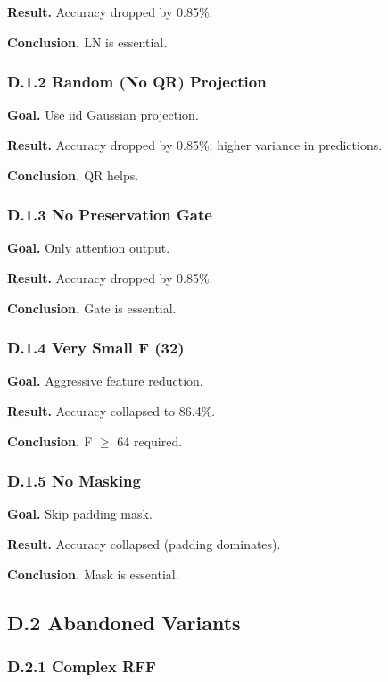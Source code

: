 \textbf{Result.} Accuracy dropped by 0.85\%.

\textbf{Conclusion.} LN is essential.

\subsubsection{D.1.2 Random (No QR) Projection}

\textbf{Goal.} Use iid Gaussian projection.

\textbf{Result.} Accuracy dropped by 0.85\%; higher variance in 
predictions.

\textbf{Conclusion.} QR helps.

\subsubsection{D.1.3 No Preservation Gate}

\textbf{Goal.} Only attention output.

\textbf{Result.} Accuracy dropped by 0.85\%.

\textbf{Conclusion.} Gate is essential.

\subsubsection{D.1.4 Very Small F (32)}

\textbf{Goal.} Aggressive feature reduction.

\textbf{Result.} Accuracy collapsed to 86.4\%.

\textbf{Conclusion.} F $\ge$ 64 required.

\subsubsection{D.1.5 No Masking}

\textbf{Goal.} Skip padding mask.

\textbf{Result.} Accuracy collapsed (padding dominates).

\textbf{Conclusion.} Mask is essential.

\subsection{D.2 Abandoned Variants}

\subsubsection{D.2.1 Complex RFF}

